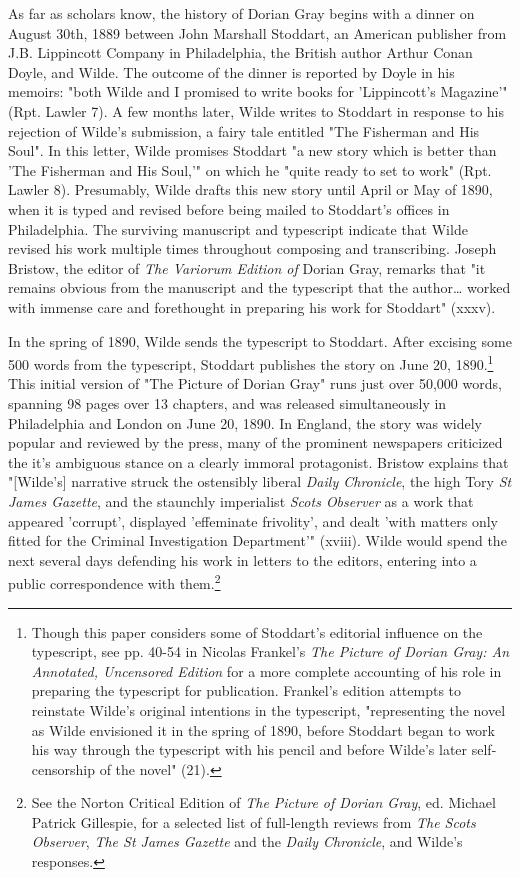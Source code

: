 \documentclass[11pt]{article}
\begin{document}
As far as scholars know, the history of Dorian Gray begins with a
dinner on August 30th, 1889 between John Marshall Stoddart, an
American publisher from J.B. Lippincott Company in Philadelphia, the
British author Arthur Conan Doyle, and Wilde. The outcome of the
dinner is reported by Doyle in his memoirs: "both Wilde and I promised
to write books for 'Lippincott’s Magazine'" (Rpt. Lawler 7). A few
months later, Wilde writes to Stoddart in response to his rejection of
Wilde's submission, a fairy tale entitled "The Fisherman and His
Soul". In this letter, Wilde promises Stoddart "a new story which is
better than 'The Fisherman and His Soul,'" on which he "quite ready to
set to work" (Rpt. Lawler 8). Presumably, Wilde drafts this new story
until April or May of 1890, when it is typed and revised before being
mailed to Stoddart’s offices in Philadelphia. The surviving manuscript
and typescript indicate that Wilde revised his work multiple times
throughout composing and transcribing. Joseph Bristow, the editor of
\emph{The Variorum Edition of} Dorian Gray, remarks that "it remains
obvious from the manuscript and the typescript that the
author\ldots{} worked with immense care and forethought in preparing his
work for Stoddart" (xxxv). 

In the spring of 1890, Wilde sends the typescript to Stoddart. After
excising some 500 words from the typescript, Stoddart publishes the
story on June 20, 1890.\footnote{Though this paper considers some of Stoddart’s editorial
influence on the typescript, see pp. 40-54 in Nicolas Frankel's \emph{The
Picture of Dorian Gray: An Annotated, Uncensored Edition} for a more
complete accounting of his role in preparing the typescript for
publication. Frankel's edition attempts to reinstate Wilde’s original
intentions in the typescript, "representing the novel as Wilde
envisioned it in the spring of 1890, before Stoddart began to work his
way through the typescript with his pencil and before Wilde’s later
self-censorship of the novel" (21).} This initial version of "The Picture of
Dorian Gray" runs just over 50,000 words, spanning 98 pages over 13
chapters, and was released simultaneously in Philadelphia and London
on June 20, 1890. In England, the story was widely popular and
reviewed by the press, many of the prominent newspapers criticized the
it's ambiguous stance on a clearly immoral protagonist. Bristow
explains that "[Wilde’s] narrative struck the ostensibly liberal
\emph{Daily Chronicle}, the high Tory \emph{St James Gazette}, and the staunchly
imperialist \emph{Scots Observer} as a work that appeared 'corrupt',
displayed 'effeminate frivolity', and dealt 'with matters only fitted
for the Criminal Investigation Department'" (xviii). Wilde would spend
the next several days defending his work in letters to the editors,
entering into a public correspondence with them.\footnote{See the Norton Critical Edition of \emph{The Picture of Dorian
Gray}, ed. Michael Patrick Gillespie, for a selected list of
full-length reviews from \emph{The Scots Observer}, \emph{The St James Gazette}
and the \emph{Daily Chronicle}, and Wilde’s responses.}
\end{document}
